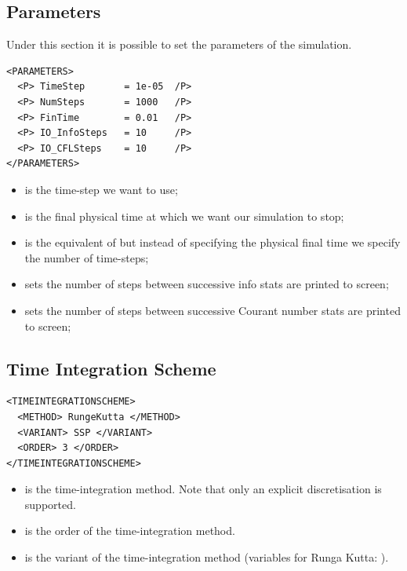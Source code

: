 \subsection*{Parameters}
Under this section it is possible to set the parameters of the simulation.
\begin{lstlisting}[style=XmlStyle]
<PARAMETERS>
  <P> TimeStep       = 1e-05  /P>
  <P> NumSteps       = 1000   /P>
  <P> FinTime        = 0.01   /P>
  <P> IO_InfoSteps   = 10     /P>
  <P> IO_CFLSteps    = 10     /P>
</PARAMETERS>
\end{lstlisting}
\begin{itemize}
    \item {} is the time-step we want to use;
    \item {} is the final physical time at which we want our simulation to stop;
    \item {} is the equivalent of  but instead of specifying the physical final time we specify the number of time-steps;
    \item {} sets the number of steps between successive info stats are printed to screen;
    \item {} sets the number of steps between successive Courant number stats are printed to screen;
\end{itemize}

\subsection{Time Integration Scheme}
\begin{lstlisting}[style=XmlStyle]
<TIMEINTEGRATIONSCHEME>
  <METHOD> RungeKutta </METHOD>
  <VARIANT> SSP </VARIANT>
  <ORDER> 3 </ORDER>
</TIMEINTEGRATIONSCHEME>
\end{lstlisting}

\begin{itemize}
    \item {} is the time-integration method. 
    Note that only an explicit discretisation is supported.
    \item {} is the order of the time-integration method. 
    \item {} is the variant of the time-integration
      method (variables for Runga Kutta: ). 
\end{itemize}

